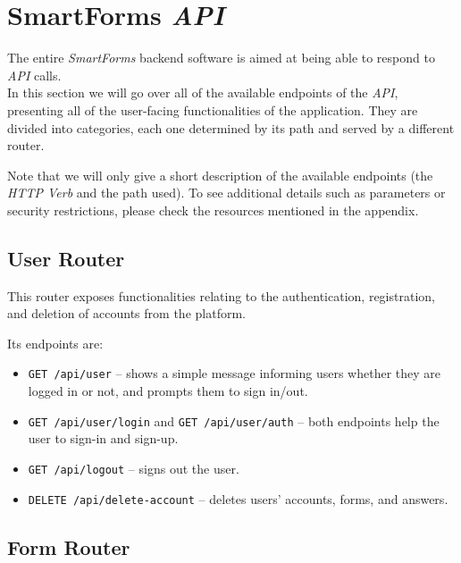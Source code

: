 \documentclass[11pt, a4paper]{report}
\def\code#1{\texttt{#1}}
\begin{document}
\section{SmartForms \textit{API}}

The entire \textit{SmartForms} backend software is aimed at being able to respond to \textit{API} calls.\\
In this section we will go over all of the available endpoints of the \textit{API}, presenting all of the user-facing functionalities of the application. They are divided into categories, each one determined by its path and served by a different router.

Note that we will only give a short description of the available endpoints (the \textit{HTTP Verb} and the path used). To see additional details such as parameters or security restrictions, please check the resources mentioned in the appendix.

\subsection{User Router}

This router exposes functionalities relating to the authentication, registration, and deletion of accounts from the platform.

Its endpoints are:
\begin{itemize}
    \item \code{GET /api/user} -- shows a simple message informing users whether they are logged in or not, and prompts them to sign in/out.
    \item \code{GET /api/user/login} and \code{GET /api/user/auth} -- both endpoints help the user to sign-in and sign-up.
    \item \code{GET /api/logout} -- signs out the user.
    \item \code{DELETE /api/delete-account} -- deletes users' accounts, forms, and answers.
\end{itemize}

\subsection{Form Router}
\end{document}
